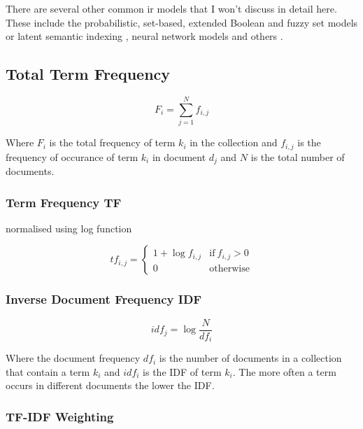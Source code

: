 There are several other common \gls{ir} models that I won't discuss in detail here. These include the probabilistic, set-based, extended Boolean and fuzzy set \citep{Miyamoto2010, Miyamoto1988, Srinivasan2001, Widyantoro2001, Miyamoto1986} models or latent semantic indexing \citep{Deerwester1990}, neural network models and others \citep{Macdonald2009, Schuetze1998, Schuetze}.


\subsection*{Total Term Frequency}

\begin{equation}
  F_i = \sum_{j=1}^{N}f_{i,j}
  \label{eq:Fi}
\end{equation}

Where $F_i$ is the total frequency of term $k_i$ in the collection and $f_{i,j}$ is the frequency of occurance of term $k_i$ in document $d_j$ and $N$ is the total number of documents.


\subsubsection*{Term Frequency TF}

normalised using log function

\begin{equation}
  tf_{i,j}=
  \begin{cases}
  1+\log f_{i,j} & \text{if} \ f_{i,j} > 0\\
  0 & \text{otherwise}
  \end{cases}
  \label{eq:tfij}
\end{equation}


\subsubsection*{Inverse Document Frequency IDF}

\begin{equation}
  idf_j = \log \frac{N}{df_i}
  \label{eq:idfj}
\end{equation}

Where the document frequency $df_i$ is the number of documents in a collection that contain a term $k_i$ and $idf_i$ is the IDF of term $k_i$. The more often a term occurs in different documents the lower the IDF.


\subsubsection*{TF-IDF Weighting}

